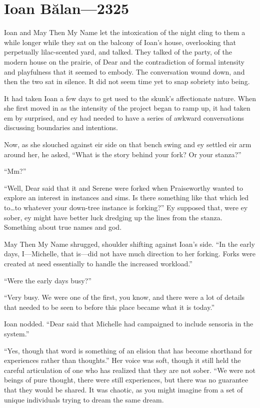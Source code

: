 \hypertarget{ioan-bux103lan-2325}{%
\chapter{Ioan Bălan—2325}\label{ioan-bux103lan-2325}}

Ioan and May Then My Name let the intoxication of the night cling to them a while longer while they sat on the balcony of Ioan's house, overlooking that perpetually lilac-scented yard, and talked. They talked of the party, of the modern house on the prairie, of Dear and the contradiction of formal intensity and playfulness that it seemed to embody. The conversation wound down, and then the two sat in silence. It did not seem time yet to snap sobriety into being.

It had taken Ioan a few days to get used to the skunk's affectionate nature. When she first moved in as the intensity of the project began to ramp up, it had taken em by surprised, and ey had needed to have a series of awkward conversations discussing boundaries and intentions.

Now, as she slouched against eir side on that bench swing and ey settled eir arm around her, he asked, ``What is the story behind your fork? Or your stanza?''

``Mm?''

``Well, Dear said that it and Serene were forked when Praiseworthy wanted to explore an interest in instances and sims. Is there something like that which led to\ldots to whatever your down-tree instance is forking?'' Ey supposed that, were ey sober, ey might have better luck dredging up the lines from the stanza. Something about true names and god.

May Then My Name shrugged, shoulder shifting against Ioan's side. ``In the early days, I---Michelle, that is---did not have much direction to her forking. Forks were created at need essentially to handle the increased workload.''

``Were the early days busy?''

``Very busy. We were one of the first, you know, and there were a lot of details that needed to be seen to before this place became what it is today.''

Ioan nodded. ``Dear said that Michelle had campaigned to include sensoria in the system.''

``Yes, though that word is something of an elision that has become shorthand for experiences rather than thoughts.'' Her voice was soft, though it still held the careful articulation of one who has realized that they are not sober. ``We were not beings of pure thought, there were still experiences, but there was no guarantee that they would be shared. It was chaotic, as you might imagine from a set of unique individuals trying to dream the same dream.

